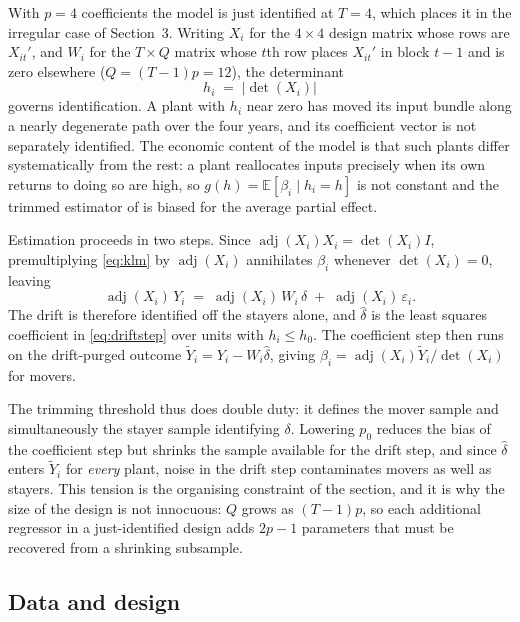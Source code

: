 With $p = 4$ coefficients the model is just identified at $T = 4$, which places
it in the irregular case of Section~3. Writing $X_i$ for the $4 \times 4$
design matrix whose rows are $X_{it}'$, and $W_i$ for the $T \times Q$ matrix
whose $t$th row places $X_{it}'$ in block $t-1$ and is zero elsewhere
($Q = (T-1)p = 12$), the determinant
\begin{equation*}
  h_i \;=\; |\det(X_i)|
\end{equation*}
governs identification. A plant with $h_i$ near zero has moved its input bundle
along a nearly degenerate path over the four years, and its coefficient vector
is not separately identified. The economic content of the model is that such
plants differ systematically from the rest: a plant reallocates inputs
precisely when its own returns to doing so are high, so
$g(h) = \mathbb{E}[\beta_i \mid h_i = h]$ is not constant and the trimmed
estimator of \citet{GrahamPowell2012} is biased for the average partial effect.

Estimation proceeds in two steps. Since
$\operatorname{adj}(X_i)X_i = \det(X_i)I$, premultiplying \eqref{eq:klm} by
$\operatorname{adj}(X_i)$ annihilates $\beta_i$ whenever $\det(X_i) = 0$,
leaving
\begin{equation}
  \operatorname{adj}(X_i)\,Y_i \;=\; \operatorname{adj}(X_i)\,W_i\,\delta
                                 \;+\; \operatorname{adj}(X_i)\,\varepsilon_i .
  \label{eq:driftstep}
\end{equation}
The drift is therefore identified off the stayers alone, and $\hat\delta$ is
the least squares coefficient in \eqref{eq:driftstep} over units with
$h_i \leq h_0$. The coefficient step then runs on the drift-purged outcome
$\tilde Y_i = Y_i - W_i\hat\delta$, giving
$\hat\beta_i = \operatorname{adj}(X_i)\tilde Y_i/\det(X_i)$ for movers.

The trimming threshold thus does double duty: it defines the mover sample and
simultaneously the stayer sample identifying $\delta$. Lowering $p_0$ reduces
the bias of the coefficient step but shrinks the sample available for the drift
step, and since $\hat\delta$ enters $\tilde Y_i$ for \emph{every} plant, noise
in the drift step contaminates movers as well as stayers. This tension is the
organising constraint of the section, and it is why the size of the design is
not innocuous: $Q$ grows as $(T-1)p$, so each additional regressor in a
just-identified design adds $2p-1$ parameters that must be recovered from a
shrinking subsample.

\subsection{Data and design}

